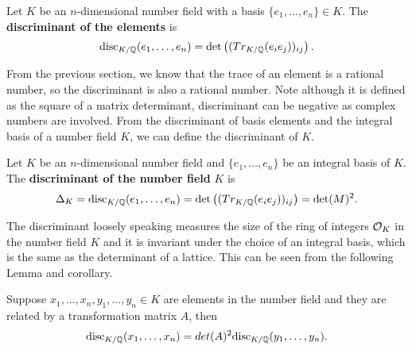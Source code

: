 \documentclass[../main.tex]{subfiles}
\begin{document}
\begin{definition}
Let $K$ be an $n$-dimensional number field with a basis $\{e_1, \dots, e_n\} \in K$. The \textbf{discriminant of the elements} is  
\begin{equation*}
    \text{disc}_{K / \mathbb{Q}}(e_1, \dots, e_n) = \det \left( (Tr_{K / \mathbb{Q}}(e_i e_j))_{ij} \right).
\end{equation*}
	
\end{definition}

From the previous section, we know that the trace of an element is a rational number, so the discriminant is also a rational number. Note although it is defined as the square of a matrix determinant, discriminant can be negative as complex numbers are involved. From the discriminant of basis elements and the integral basis of a number field $K$, we can define the discriminant of $K$. 

\iffalse
Next, we define the discriminant of an ideal. 
	
\begin{definition}
Let $K$ be a number field of degree $n$ and $I$ be a non-zero ideal of $\OO_K$ \reversemarginpar
\marginnote{Ideal discriminant}
with $B=\{b_1, \dots, b_n\}$ being a basis of $I$. The \textbf{discriminant} of the ideal $I$ is 
\begin{equation*}
    D(I) = \text{disc}(b_1, \dots, b_n).
\end{equation*}
\end{definition}
\fi 

\begin{definition}
Let $K$ be an $n$-dimensional number field and $\{e_1, \dots, e_n\}$ be an
\reversemarginpar
{}
integral basis of $K$. The \textbf{discriminant of the number field} $K$ is 
\begin{equation*}
	\Delta_K = \text{disc}_{K/\mathbb{Q}}(e_1, \dots, e_n)=\det \left(( Tr_{K / \mathbb{Q}}(e_i e_j))_{ij} \right) = \det (M)^2.
\end{equation*}
\end{definition}

The discriminant loosely speaking measures the size of the ring of integers $\OO_K$ in the number field $K$ and it is invariant under the choice of an integral basis, which is the same as the determinant of a lattice. This can be seen from the following Lemma and corollary. 

\begin{lemma}
Suppose  $x_1, \dots, x_n, y_1, \dots, y_n \in K$ are elements in the number field and they are related by a transformation matrix $A$, then 
\begin{equation*}
    \text{disc}_{K / \mathbb{Q}}(x_1, \dots, x_n) = det (A)^2 \text{disc}_{K / \mathbb{Q}}(y_1, \dots, y_n).
\end{equation*}
\end{lemma}
\end{document}
